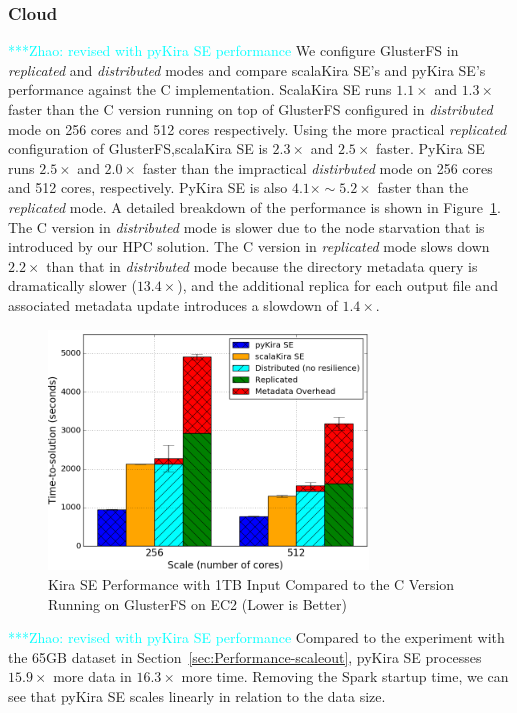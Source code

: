 \documentclass[10pt,journal,compsoc]{IEEEtran}
\newcommand{\zhaonote}[1]{{\textcolor{cyan}    { ***Zhao:      #1 }}}
\newcommand{\zhaonote}[1]{}
\begin{document}
\subsubsection{Cloud}
\label{sec:1TB-EC2}
\zhaonote{revised with pyKira SE performance}
We configure GlusterFS in \emph{replicated} and \emph{distributed} modes and compare scalaKira
SE's and pyKira SE's performance against the C implementation. 
ScalaKira SE runs $1.1\times$ and $1.3\times$ faster than the C version running on top of
GlusterFS configured in \emph{distributed} mode on 256 cores and 512 cores respectively. 
Using the more practical \emph{replicated} configuration of GlusterFS,scalaKira SE is $2.3\times$ and $2.5\times$ faster. 
PyKira SE runs $2.5\times$ and $2.0\times$ faster than the impractical \emph{distirbuted} mode on 256 cores and 512 cores, respectively.
PyKira SE is also $4.1\times\sim5.2\times$ faster than the \emph{replicated} mode.
A detailed breakdown of the performance is shown in Figure~\ref{fig:1tb-ec2}.
The C version in \emph{distributed} mode is slower due to the node starvation that is introduced by our HPC solution.
The C version in \emph{replicated} mode slows down $2.2\times$ than that in \emph{distributed} mode because the directory metadata query
is dramatically slower ($13.4\times$), and the additional replica for each output file and associated metadata update introduces a slowdown
of $1.4\times$.


\begin{figure}[t]
	\begin{center}
		\includegraphics[width=85mm]{pictures/1TB-EC2}
		\caption{Kira SE Performance with 1TB Input Compared to the C Version Running on GlusterFS on EC2 (Lower is Better)
		\label{fig:1tb-ec2}}
  	\end{center}
\end{figure}

\zhaonote{revised with pyKira SE performance}
Compared to the experiment with the 65GB dataset in Section~\ref{sec:Performance-scaleout},
pyKira SE processes $15.9\times$ more data in $16.3\times$ more time. Removing the Spark
startup time, we can see that pyKira SE scales linearly in relation to the data size.
\end{document}
